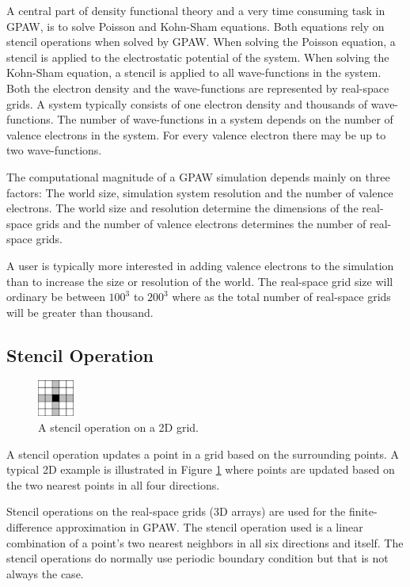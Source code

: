 \documentclass[preprint,3p,times,twocolumn]{elsarticle}
\begin{document}
A central part of density functional theory and a very time consuming task in GPAW, is to solve Poisson and Kohn-Sham equations. Both equations rely on stencil operations when solved by GPAW. When solving the Poisson equation, a stencil is applied to the electrostatic potential of the system. When solving the Kohn-Sham equation, a stencil is applied to all wave-functions in the system. Both the electron density and the wave-functions are represented by real-space grids. A system typically consists of one electron density and thousands of wave-functions. The number of wave-functions in a system depends on the number of valence electrons in the system. For every valence electron there may be up to two wave-functions.

The computational magnitude of a GPAW simulation depends mainly on three factors: The world size, simulation system resolution and the number of valence electrons. The world size and resolution determine the dimensions of the real-space grids and the number of valence electrons determines the number of real-space grids.

A user is typically more interested in adding valence electrons to the simulation than to increase the size or resolution of the world. The real-space grid size will ordinary be between $100^3$ to $200^3$ where as the total number of real-space grids will be greater than thousand.

\subsection{Stencil Operation}
\begin{figure}
 \centering
 \includegraphics[width=45px]{gfx/stencil}
 \caption{A stencil operation on a 2D grid.}
 \label{fig:stencil}
\end{figure}
A stencil operation updates a point in a grid based on the surrounding points. A typical 2D example is illustrated in Figure \ref{fig:stencil} where points are updated based on the two nearest points in all four directions.

Stencil operations on the real-space grids (3D arrays) are used for the finite-difference approximation in GPAW. The stencil operation used is a linear combination of a point's two nearest neighbors in all six directions and itself. 
The stencil operations do normally use periodic boundary condition but that is not always the case.
\end{document}
